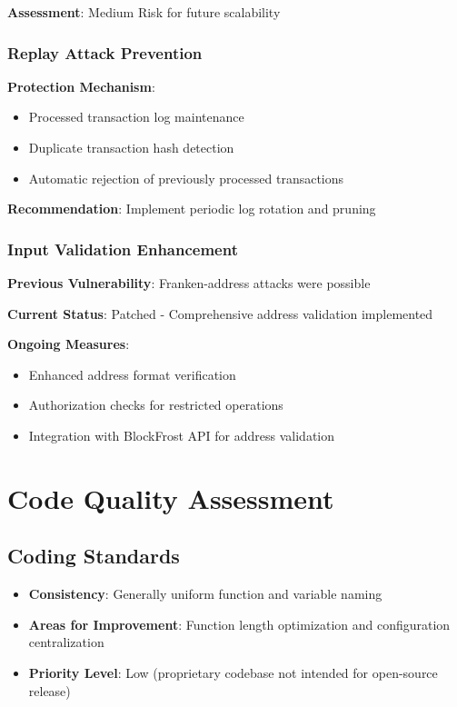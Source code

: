 \documentclass[11pt,a4paper]{article}
\begin{document}
\textbf{Assessment}: \textcolor{danzoOrange}{Medium Risk} for future scalability

\subsubsection{Replay Attack Prevention}
\textbf{Protection Mechanism}:
\begin{itemize}
    \item Processed transaction log maintenance
    \item Duplicate transaction hash detection
    \item Automatic rejection of previously processed transactions
\end{itemize}

\textbf{Recommendation}: Implement periodic log rotation and pruning

\subsubsection{Input Validation Enhancement}
\textbf{Previous Vulnerability}: Franken-address attacks were possible

\textbf{Current Status}: \textcolor{danzoGreen}{Patched} - Comprehensive address validation implemented

\textbf{Ongoing Measures}:
\begin{itemize}
    \item Enhanced address format verification
    \item Authorization checks for restricted operations
    \item Integration with BlockFrost API for address validation
\end{itemize}

\section{Code Quality Assessment}

\subsection{Coding Standards}
\begin{itemize}
    \item \textbf{Consistency}: Generally uniform function and variable naming
    \item \textbf{Areas for Improvement}: Function length optimization and configuration centralization
    \item \textbf{Priority Level}: Low (proprietary codebase not intended for open-source release)
\end{itemize}
\end{document}
